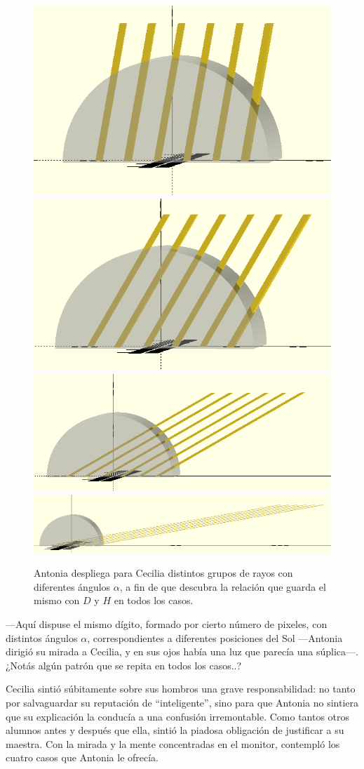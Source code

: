 \begin{figure}[ht]
  \centering
  \includegraphics[width=.49\textwidth]{imagenes/rayos-10}\hfill
\includegraphics[width=.49\textwidth]{imagenes/rayos-30}
\includegraphics[width=.9\textwidth]{imagenes/rayos-60}
\includegraphics[width=1\textwidth]{imagenes/rayos-80}
\caption{Antonia despliega para Cecilia distintos grupos de rayos con
  diferentes ángulos $\alpha$, a fin de que descubra la relación que
  guarda el mismo con $D$ y $H$ en todos los casos.}
\label{fig:rayos-10-30-60-80}
\end{figure}

---Aquí dispuse el mismo dígito, formado por cierto número de pixeles,
con distintos ángulos $\alpha$, correspondientes a diferentes
posiciones del Sol ---Antonia dirigió su mirada a Cecilia, y en sus
ojos había una luz que parecía una súplica---. ¿Notás algún patrón que
se repita en todos los casos..?

  Cecilia sintió súbitamente sobre sus hombros una grave
  responsabilidad: no tanto por salvaguardar su reputación de
  ``inteligente'', sino para que Antonia no sintiera que su
  explicación la conducía a una confusión irremontable.  Como tantos
  otros alumnos antes y después que ella, sintió la piadosa obligación
  de justificar a su maestra. Con la mirada y la mente concentradas en
  el monitor, contempló los cuatro casos que Antonia le
  ofrecía.%

